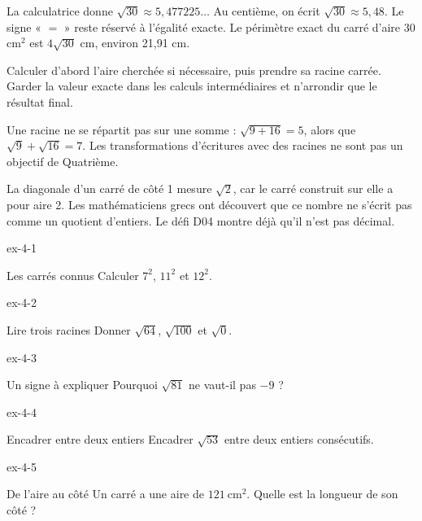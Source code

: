 \begin{exemple}La calculatrice donne $\sqrt{30}\approx5{,}477225\ldots$ Au centième, on écrit $\sqrt{30}\approx5{,}48$. Le signe « $=$ » reste réservé à l’égalité exacte. Le périmètre exact du carré d’aire 30 cm$^2$ est $4\sqrt{30}$ cm, environ 21,91 cm.\end{exemple}
\begin{savoirfaire}Calculer d’abord l’aire cherchée si nécessaire, puis prendre sa racine carrée. Garder la valeur exacte dans les calculs intermédiaires et n’arrondir que le résultat final.\end{savoirfaire}
\begin{attention}Une racine ne se répartit pas sur une somme : $\sqrt{9+16}=5$, alors que $\sqrt9+\sqrt{16}=7$. Les transformations d’écritures avec des racines ne sont pas un objectif de Quatrième.\end{attention}
\begin{exemple}La diagonale d’un carré de côté 1 mesure $\sqrt2$, car le carré construit sur elle a pour aire 2. Les mathématiciens grecs ont découvert que ce nombre ne s’écrit pas comme un quotient d’entiers. Le défi D04 montre déjà qu’il n’est pas décimal.\end{exemple}

\clearpage{}
\begin{blocLivre}{ex-4-1}\begin{exercice}[1]{Les carrés connus}
Calculer $7^2$, $11^2$ et $12^2$.
\end{exercice}\end{blocLivre}
\begin{blocLivre}{ex-4-2}\begin{exercice}[1]{Lire trois racines}
Donner $\sqrt{64}$, $\sqrt{100}$ et $\sqrt{0}$.
\end{exercice}\end{blocLivre}
\begin{blocLivre}{ex-4-3}\begin{exercice}[1]{Un signe à expliquer}
Pourquoi $\sqrt{81}$ ne vaut-il pas $-9$ ?
\end{exercice}\end{blocLivre}
\begin{blocLivre}{ex-4-4}\begin{exercice}[1]{Encadrer entre deux entiers}
Encadrer $\sqrt{53}$ entre deux entiers consécutifs.
\end{exercice}\end{blocLivre}
\begin{blocLivre}{ex-4-5}\begin{exercice}[1]{De l’aire au côté}
Un carré a une aire de $121\ \mathrm{cm}^2$. Quelle est la longueur de son côté ?
\label{fig-ex-4-5}
\end{exercice}\end{blocLivre}


